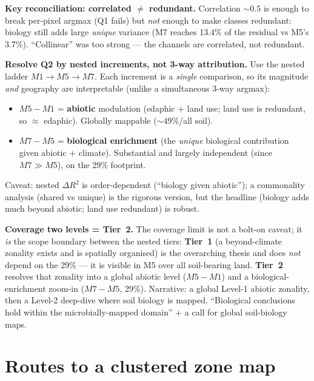 \documentclass[11pt,a4paper]{article}
\begin{document}
\noindent\textbf{Key reconciliation: correlated $\neq$ redundant.}
Correlation $\sim0.5$ is enough to break per-pixel argmax (Q1 fails) but
\emph{not} enough to make classes redundant: biology still adds large
\emph{unique} variance (M7 reaches 13.4\% of the residual vs M5's 3.7\%).
``Collinear'' was too strong --- the channels are correlated, not redundant.

\noindent\textbf{Resolve Q2 by nested increments, not 3-way attribution.}
Use the nested ladder $M1\!\to\!M5\!\to\!M7$. Each increment is a \emph{single}
comparison, so its magnitude \emph{and} geography are interpretable (unlike a
simultaneous 3-way argmax):
\begin{itemize}[nosep]
  \item $M5-M1$ = \textbf{abiotic} modulation (edaphic + land use; land use is
  redundant, so $\approx$ edaphic). Globally mappable ($\sim$49\%/all soil).
  \item $M7-M5$ = \textbf{biological enrichment} (the \emph{unique} biological
  contribution given abiotic + climate). Substantial and largely independent
  (since $M7\gg M5$), on the 29\% footprint.
\end{itemize}
Caveat: nested $\Delta R^2$ is order-dependent (``biology given abiotic''); a
commonality analysis (shared vs unique) is the rigorous version, but the
headline (biology adds much beyond abiotic; land use redundant) is robust.

\noindent\textbf{Coverage two levels = Tier~2.} The coverage limit is not a
bolt-on caveat; it \emph{is} the scope boundary between the nested tiers:
\textbf{Tier~1} (a beyond-climate zonality exists and is spatially organised)
is the overarching thesis and does \emph{not} depend on the 29\% --- it is
visible in M5 over all soil-bearing land. \textbf{Tier~2} resolves that
zonality into a global abiotic level ($M5-M1$) and a biological-enrichment
zoom-in ($M7-M5$, 29\%). Narrative: a global Level-1 abiotic zonality, then a
Level-2 deep-dive where soil biology is mapped. ``Biological conclusions hold
within the microbially-mapped domain'' + a call for global soil-biology maps.

\section{Routes to a clustered zone map}
\end{document}
